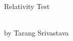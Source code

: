 \documentclass[10pt, twocolumn]{article}
\author{Tarang Srivastava}
\newcommand{\makechaptertitle}[1]{
\begin{center}
	\begin{large}
		#1
	\end{large}
	\begin{small}
		\\by Tarang Srivastava
	\end{small}
\end{center}
}
\theoremstyle{definition}
\begin{document}
		\makechaptertitle{Relativity Test}
\end{document}
